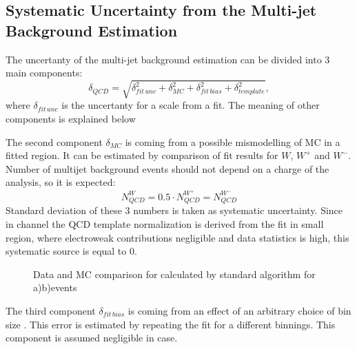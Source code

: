 \subsection{Systematic Uncertainty from the Multi-jet Background Estimation }\label{sec:QCDUnc}

The uncertanty of the multi-jet background estimation can be divided into 3 main components:
\begin{equation}
\delta_{QCD} = \sqrt{ \delta_{fit\, unc}^{2}+\delta_{MC}^{2}+\delta_{fit\, bias}^{2}+\delta_{template}^{2}}, 
\end{equation}
where $\delta_{fit\, unc}$ is the uncertanty for a scale from a \chiD fit. The meaning of other components is explained below

The second component $\delta_{MC}$ is coming from a possible mismodelling of MC in a fitted region. It can be estimated by comparison of fit results for $W$, $W^{+}$ and $W^{-}$. Number of multijet background events should not depend on a charge of the analysis, so it is expected:
\begin{equation}
N_{QCD}^{W}=0.5 \cdot N_{QCD}^{W^{+}} =N_{QCD}^{W^{-}}
\end{equation}
Standard deviation of these 3 numbers is taken as systematic uncertainty. Since in \wmunu channel the QCD template normalization is derived from the fit in small \mtw region, where electroweak contributions negligible and data statistics is high, this systematic source is equal to 0.

\begin{figure}[!tbp]
\begin{minipage}[h]{0.49\linewidth}
\end{minipage}
\hfill
\begin{minipage}[h]{0.49\linewidth}
\end{minipage}
\caption{Data and MC comparison for \etmiss calculated by standard \atlas algorithm for a)\wenu b)\wmunu events}
\label{ris:TemplateVar}
\end{figure}

The third component $\delta_{fit\, bias}$ is coming from an effect of an arbitrary choice of bin size . This error is estimated by repeating the fit for a different binnings. This component is assumed negligible in \wmunu case. 

